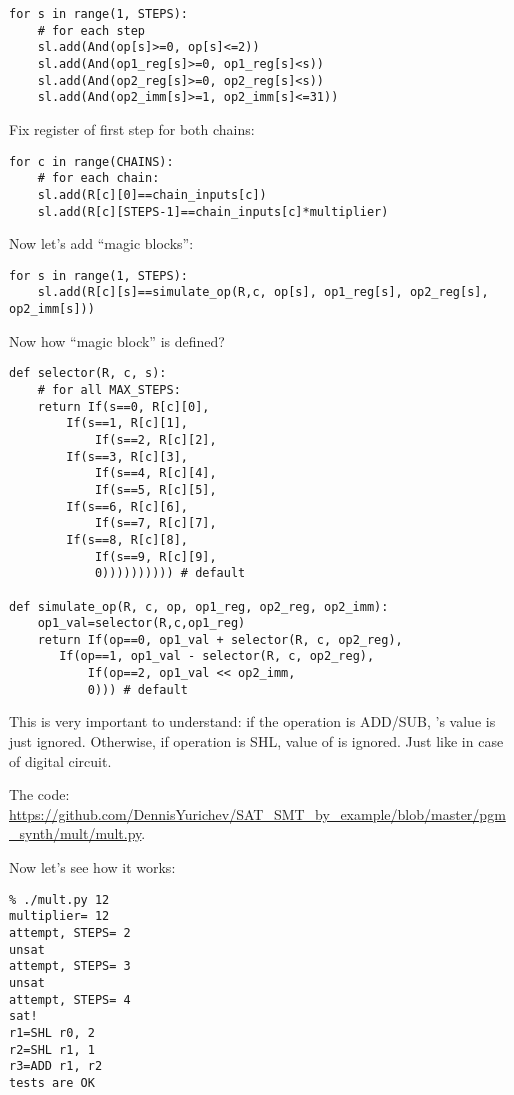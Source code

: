 \begin{lstlisting}
for s in range(1, STEPS):
    # for each step
    sl.add(And(op[s]>=0, op[s]<=2))
    sl.add(And(op1_reg[s]>=0, op1_reg[s]<s))
    sl.add(And(op2_reg[s]>=0, op2_reg[s]<s))
    sl.add(And(op2_imm[s]>=1, op2_imm[s]<=31))
\end{lstlisting}

Fix register of first step for both chains:

\begin{lstlisting}
for c in range(CHAINS):
    # for each chain:
    sl.add(R[c][0]==chain_inputs[c])
    sl.add(R[c][STEPS-1]==chain_inputs[c]*multiplier)
\end{lstlisting}

Now let's add ``magic blocks'':

\begin{lstlisting}
for s in range(1, STEPS):
    sl.add(R[c][s]==simulate_op(R,c, op[s], op1_reg[s], op2_reg[s], op2_imm[s]))
\end{lstlisting}

Now how ``magic block'' is defined?

\begin{lstlisting}
def selector(R, c, s):
    # for all MAX_STEPS:
    return If(s==0, R[c][0],
	    If(s==1, R[c][1],
            If(s==2, R[c][2],
	    If(s==3, R[c][3],
            If(s==4, R[c][4],
            If(s==5, R[c][5],
	    If(s==6, R[c][6],
            If(s==7, R[c][7],
	    If(s==8, R[c][8],
            If(s==9, R[c][9],
	        0)))))))))) # default

def simulate_op(R, c, op, op1_reg, op2_reg, op2_imm):
    op1_val=selector(R,c,op1_reg)
    return If(op==0, op1_val + selector(R, c, op2_reg),
	   If(op==1, op1_val - selector(R, c, op2_reg),
           If(op==2, op1_val << op2_imm,
	       0))) # default
\end{lstlisting}

This is very important to understand: if the operation is ADD/SUB, 's value is just ignored.
Otherwise, if operation is SHL, value of  is ignored.
Just like in case of digital circuit.

The code: \url{https://github.com/DennisYurichev/SAT_SMT_by_example/blob/master/pgm_synth/mult/mult.py}.

Now let's see how it works:

\begin{lstlisting}
% ./mult.py 12
multiplier= 12
attempt, STEPS= 2
unsat
attempt, STEPS= 3
unsat
attempt, STEPS= 4
sat!
r1=SHL r0, 2
r2=SHL r1, 1
r3=ADD r1, r2
tests are OK
\end{lstlisting}

